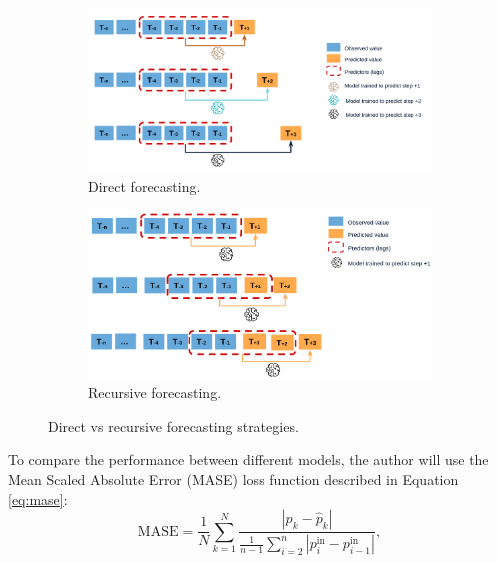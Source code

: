 \begin{figure}[H]
\centering
    \begin{subfigure}{.45\textwidth}
        \centering
        \includegraphics[width=1\linewidth]{images/methodology/direct-multi-step-forecasting}
        \caption{Direct forecasting.}
    \end{subfigure}
    \begin{subfigure}{.45\textwidth}
        \centering
        \includegraphics[width=1\linewidth]{images/methodology/recursive-mutistep-forecasting}
        \caption{Recursive forecasting.}
    \end{subfigure}

    \caption{Direct vs recursive forecasting strategies.}
    \label{fig:direct-recursive-forecasting}
\end{figure}

To compare the performance between different models, the author will use the Mean Scaled Absolute Error (MASE) loss function described in Equation \ref{eq:mase}:
\begin{equation}
    \label{eq:mase}
    \mathrm{MASE} = \frac{1}{N}\sum_{k=1}^{N}\frac{|p_k-\hat{p}_k|}{\frac{1}{n-1}\sum_{i=2}^{n} |p^\mathrm{in}_i - p^\mathrm{in}_{i-1} |},
\end{equation}

